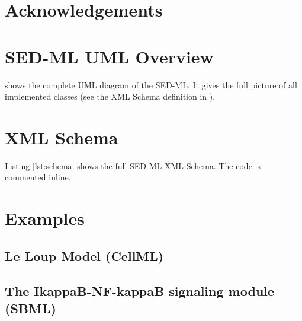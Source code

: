 \documentclass[pdftex,rgb,dvipsnames,svgnames,hyperref,table]{article}
\begin{document}
\section*{Acknowledgements}


\begin{appendix}
\newpage
\section{SED-ML UML Overview}
 shows the complete UML diagram of the SED-ML. It gives the full picture of all implemented classes (see the XML Schema definition in \pageref{lst:schema}).
\label{app:uml}
%
  

\section{XML Schema}
Listing \ref{lst:schema} shows the full SED-ML XML Schema. The code is commented inline.
\label{sec:xmlschema}


\newpage
\section{Examples}

\subsection{Le Loup Model (CellML)}


\newpage
\subsection{The IkappaB-NF-kappaB signaling module (SBML)}


\end{appendix}



\end{document}
